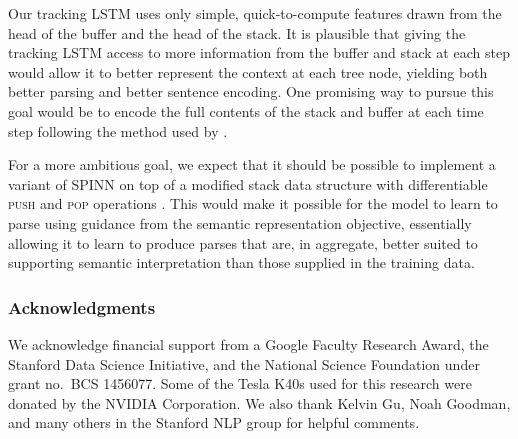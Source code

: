 \documentclass[11pt]{article}
\begin{document}
Our tracking LSTM uses only simple, quick-to-compute features drawn from the head of the buffer and the head of the stack. It is plausible that giving the tracking LSTM access to more information from the buffer and stack at each step would allow it to better represent the context at each tree node, yielding both better parsing and better sentence encoding. One promising way to pursue this goal would be to encode the full contents of the stack and buffer at each time step following the method used by \citet{dyer-EtAl:2015:ACL-IJCNLP}.

For a more ambitious goal, we expect that it should be possible to implement a variant of SPINN on top of a modified stack data structure with differentiable \textsc{push} and \textsc{pop} operations \citep[as in][]{grefenstette2015learning,joulin2015inferring}. This would make it possible for the model to learn to parse using guidance from the semantic representation objective, essentially allowing it to learn to produce parses that are, in aggregate, better suited to supporting semantic interpretation than those supplied in the training data.


\subsubsection*{Acknowledgments}

We acknowledge financial support from a Google Faculty Research Award, the Stanford Data Science Initiative, and the National Science Foundation under grant no.~BCS 1456077. Some of the Tesla K40s used for this research were donated by the NVIDIA Corporation. We also thank Kelvin Gu, Noah Goodman, and many others in the Stanford NLP group for helpful comments.



\end{document}
